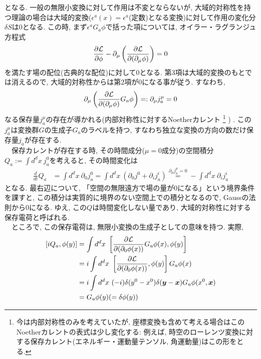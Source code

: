 \documentclass{ltjsarticle}
\theoremstyle{mystyle} %
\numberwithin{equation}{section}
\begin{document}
となる. 
一般の無限小変換に対して作用は不変とならないが, 大域的対称性を持つ理論の場合は大域的変換($\epsilon^a(x)=\epsilon^a$(定数)となる変換)に対して作用の変化分$\delta S$は0となる. 
この時, まず$\epsilon^a G_a \phi$で括った項については, オイラー・ラグランジュ方程式
\begin{align}
    \frac{\partial \mathcal{L}}{\partial \phi
    } - \partial_\mu\left({\frac{\partial\mathcal{L}}{\partial(\partial_\mu \phi)}}\right)=0
\end{align}
を満たす場の配位(古典的な配位)に対して0となる. 
第3項は大域的変換のもとでは消えるので, 大域的対称性からは第2項が$0$になる事が従う. すなわち, 
\begin{align}
    \partial_\mu\left({\frac{\partial\mathcal{L}}{\partial(\partial_\mu \phi)} G_a \phi}\right) =: \partial_\mu j^\mu_a = 0
\end{align}
なる保存量$j^\mu_a$の存在が導かれる(内部対称性に対するNoetherカレント
\footnote{今は内部対称性のみを考えていたが, 座標変換も含めて考える場合はこのNoetherカレントの表式は少し変化する: 
例えば, 時空のローレンツ変換に対する保存カレント(エネルギー・運動量テンソル, 角運動量)はこの形をとる. }
)
. この$j^\mu_a$は変換群$G$の生成子$G_a$のラベルを持つ, すなわち独立な変換の方向の数だけ保存量$j_a$が存在する. \\
　保存カレントが存在する時, その時間成分($\mu=0$成分)の空間積分$Q_a:=\int d^{d}x~j_a^0 $を考えると, その時間変化は
\begin{align}
    \frac{d}{dt}Q_a &= \int d^{d}x~\partial_0 j_a^0 
    = \int d^{d}x~(\partial_0 j^0+\partial_i j_a^i)
    \stackrel{\partial_\mu j_a^\mu = 0}{=}
    -\int d^{d}x~\partial_i j_a^i
\end{align}
となる. 最右辺について, 「空間の無限遠方で場の量が0になる」という境界条件を課すと, 
この積分は実質的に境界のない空間上での積分となるので, Gaussの法則から0になる. 
ゆえ, この$Q$は時間変化しない量であり, 大域的対称性に対する保存電荷と呼ばれる. \\
　ところで, この保存電荷は, 無限小変換の生成子としての意味を持つ. 実際, 
\begin{align}
    \left[{iQ_a, \phi(y)}\right]&=\int d^d x~\left[{\frac{\partial\mathcal{L}}{\partial(\partial_0 \phi(x))} G_a \phi(x), \phi(y)}\right]\\
    &=i\int d^d x~\left[{\frac{\partial\mathcal{L}}{\partial(\partial_0 \phi(x))}, \phi(y)}\right]G_a \phi(x)\\
    &=i\int d^d x~(-i)\delta(y^0-x^0)\delta(\bm{y}-\bm{x})G_a \phi(x^0, \bm{x})\\
    &=G_a\phi(y) (=\delta \phi(y))\\
\end{align}
\end{document}
